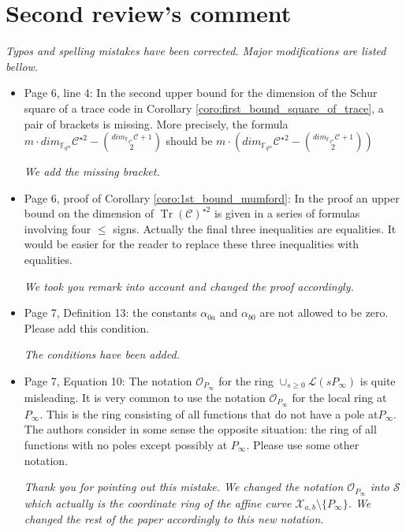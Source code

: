 \documentclass[12pt,a4paper]{amsart}
\DeclareMathOperator{\trace}{Tr}
\newcommand{\fqm}{\mathbb{F}_{q^m}}
\newcommand{\calC}{\mathcal{C}}
\newcommand{\calX}{\mathcal{X}}
\newcommand{\Tr}[1]{\trace\!\left(#1\right)}
\begin{document}
\section*{Second review's comment}

\textit{Typos and spelling mistakes have been corrected. Major modifications are listed bellow.} \\

\begin{itemize}

\item Page 6, line 4: In the second upper bound for the dimension of the Schur square of a trace code in Corollary \ref{coro:first_bound_square_of_trace}, a pair of brackets is missing. More precisely, the formula $m \cdot dim_{\fqm} \calC^{\star 2}-\binom{dim_{\fqm}\calC+1}{2}$ should be $m \cdot \left( dim_{\fqm} \calC^{\star 2} -\binom{dim_{\fqm} \calC+1}{2}\right)$

\textit{We add the missing bracket.}

\item Page 6, proof of Corollary \ref{coro:1st_bound_mumford}: In the proof an upper bound on the dimension of $\Tr{\calC}^{\star 2}$ is given in a series of formulas involving four $\le$ signs. Actually the final three inequalities are equalities. It would be easier for the reader to replace these three inequalities with equalities.

\textit{We took you remark into account and changed the proof accordingly.}


\item Page 7, Definition 13: the constants $\alpha_{0a}$ and $\alpha_{b0}$ are not allowed to be zero. Please add this condition.

\textit{The conditions have been added.} 

\item Page 7, Equation 10: The notation $\mathcal{O}_{P_\infty}$ for the ring $\cup_{s \ge 0} \mathcal{L}(sP_\infty)$ is quite misleading. It is very common to use the notation $\mathcal{O}_{P_\infty}$ for the local ring at $P_\infty$. This is the ring consisting of all functions that do not have a pole at$ P_\infty$. The authors consider in some sense the opposite situation: the ring of all functions with no poles except possibly at $P_\infty$. Please use some other notation.

\textit{Thank you for pointing out this mistake. We changed the notation $\mathcal{O}_{P_\infty}$ into $\mathcal{S}$ which actually is the coordinate ring of the affine curve $\calX_{a,b} \setminus \{P_\infty\}$. We changed the rest of the paper accordingly to this new notation.}


\end{itemize}
\end{document}
